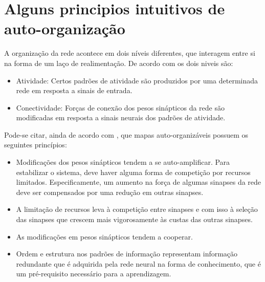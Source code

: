 \section { Alguns principios intuitivos de auto-organização}
\quad A organização da rede acontece em dois níveis diferentes, que interagem entre si na forma de um laço de realimentação.  De acordo com \cite{hay} os dois niveis são:
\begin{itemize}
\item  Atividade: Certos padrões de atividade são produzidos por uma determinada rede em resposta a sinais de entrada.
\item Conectividade: Forças de conexão dos pesos sinápticos da rede  são modificadas em resposta a sinais neurais dos padrões de atividade. 
\end{itemize}

Pode-se citar, ainda de acordo com \cite{hay}, que mapas auto-organizáveis possuem os seguintes princípios:
\begin{itemize}
\item  Modificações dos pesos  sinápticos tendem a se auto-amplificar. Para estabilizar o sistema, deve haver alguma forma de competição por recursos limitados. Especificamente, um aumento na força de algumas sinapses da rede deve ser compensados por uma redução em outras sinapses.
\item  A limitação de recursos leva à competição entre sinapses e com isso à seleção das sinapses  que crescem mais vigorosamente  às custas das outras sinapses.
\item As modificações em pesos sinápticos tendem a cooperar.
\item Ordem e estrutura nos padrões de informação representam informação redundante que é adquirida pela rede neural na forma de conhecimento, que é um pré-requisito necessário para a aprendizagem.
\end{itemize}

